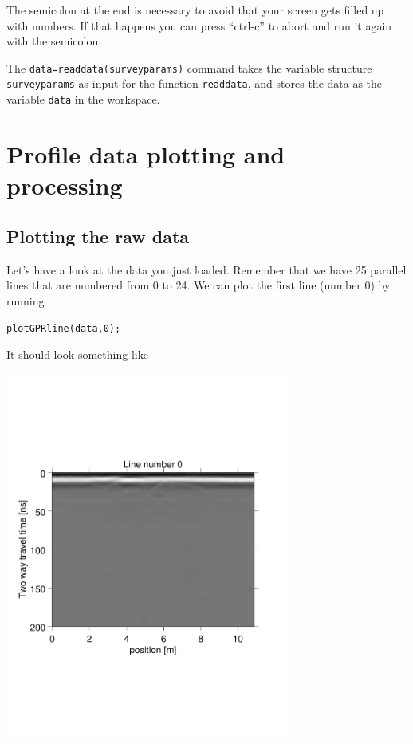 \documentclass[11pt]{article}
\begin{document}
The semicolon at the end is necessary to avoid that your screen gets
filled up with numbers. If that happens you can press ``ctrl-c'' to
abort and run it again with the semicolon.
 
The \verb#data=readdata(surveyparams)# command takes the variable structure
\verb#surveyparams# as input for the function \verb#readdata#, and stores the 
data as the variable \verb#data# in the workspace.

\section{Profile data plotting and processing}\label{secProfiles}

\subsection{Plotting the raw data}

Let's have a look at the data you just loaded. Remember that we have
25 parallel lines that are numbered from 0 to 24. We can plot the
first line (number 0) by running

\qquad \verb#plotGPRline(data,0);#

\clearpage
It should look something like
\begin{center}
\includegraphics[width=0.7\textwidth, trim = 0.9cm 6cm 2cm
  6.5cm,clip]{figures/GPRline0}
\end{center}
\end{document}
